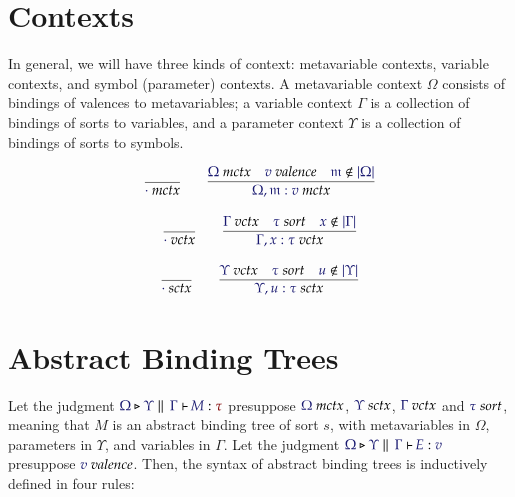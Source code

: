 \documentclass[11pt]{article}
\theoremstyle{definition}
\theoremstyle{remark}
\numberwithin{equation}{section}
\def\IModeColorName{MidnightBlue}
\def\OModeColorName{Maroon}
\newcommand\IMode[1]{{\color{\IModeColorName}{#1}}}
\newcommand\OMode[1]{{\color{\OModeColorName}{#1}}}
\newcommand\IsValence[1]{\IMode{#1}\ \textit{valence}}
\newcommand\IsSort[1]{\IMode{#1}\ \textit{sort}}
\newcommand\IsMetaCtx[1]{\IMode{#1}\ \textit{mctx}}
\newcommand\IsVarCtx[1]{\IMode{#1}\ \textit{vctx}}
\newcommand\IsSymCtx[1]{\IMode{#1}\ \textit{sctx}}
\newcommand\IsAbt[5]{%
  \IMode{#1}\triangleright%
  \IMode{#2}\parallel%
  \,{\IMode{#3}\vdash}\,%
  \IMode{#4}:\OMode{#5}%
}
\newcommand\IsBTm[5]{%
  \IMode{#1}\triangleright%
  \IMode{#2}\parallel%
  \,{\IMode{#3}\vdash}\,%
  \IMode{#4}:\IMode{#5}%
}
\newcommand\MV[1]{\mathfrak{#1}}
\newcommand\Dom[1]{\left\vert#1\right\vert}
\newcommand\NotIn[2]{\IMode{#1}\notin\IMode{#2}}
\begin{document}
\section{Contexts}

In general, we will have three kinds of context: metavariable contexts,
variable contexts, and symbol (parameter) contexts. A metavariable context
$\Omega$ consists of bindings of valences to metavariables; a variable context
$\Gamma$ is a collection of bindings of sorts to variables, and a parameter
context $\Upsilon$ is a collection of bindings of sorts to symbols.

\begin{gather*}
  \infer{
    \IsMetaCtx{\cdot}
  }{
  }\qquad
  \infer{
    \IsMetaCtx{\Omega,\MV{m}:v}
  }{
    \IsMetaCtx{\Omega} &
    \IsValence{v} &
    \NotIn{\MV{m}}{\Dom\Omega}
  }
\end{gather*}

\begin{gather*}
  \infer{
    \IsVarCtx{\cdot}
  }{
  }\qquad
  \infer{
    \IsVarCtx{\Gamma,x:\tau}
  }{
    \IsVarCtx{\Gamma} &
    \IsSort{\tau} &
    \NotIn{x}{\Dom\Gamma}
  }
\end{gather*}

\begin{gather*}
  \infer{
    \IsSymCtx{\cdot}
  }{
  }\qquad
  \infer{
    \IsSymCtx{\Upsilon,u:\tau}
  }{
    \IsVarCtx{\Upsilon} &
    \IsSort{\tau} &
    \NotIn{u}{\Dom\Upsilon}
  }
\end{gather*}

\section{Abstract Binding Trees}

Let the judgment $\IsAbt{\Omega}{\Upsilon}{\Gamma}{M}{\tau}$ presuppose
$\IsMetaCtx{\Omega}$, $\IsSymCtx\Upsilon$, $\IsVarCtx\Gamma$ and $\IsSort{\tau}$,
meaning that $M$ is an abstract binding tree of sort $s$, with metavariables in
$\Omega$, parameters in $\Upsilon$, and variables in $\Gamma$. Let the judgment
$\IsBTm{\Omega}{\Upsilon}{\Gamma}{E}{v}$ presuppose $\IsValence{v}$.  Then, the
syntax of abstract binding trees is inductively defined in four rules:
\end{document}
